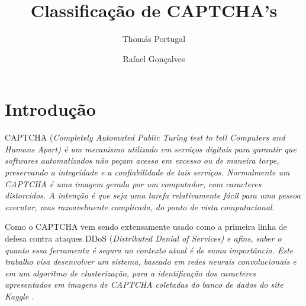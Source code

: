 \documentclass[11pt]{article}
\title{Classificação de CAPTCHA's}
\author{Thomás Portugal \and Rafael Gonçalves}
\begin{document}

  \section{Introdu\c{c}\~{a}o}
  \label{sec:introducao}

CAPTCHA (\em Completely Automated Public Turing test to tell Computers and Humans Apart\em ) é um mecanismo utilizado em serviços digitais para garantir que softwares automatizados não peçam acesso em excesso ou de maneira torpe, preservando a integridade e a confiabilidade de tais serviços. Normalmente um CAPTCHA é uma imagem gerada por um computador, com caracteres distorcidos. A intenção é que seja uma tarefa relativamente fácil para uma pessoa executar, mas razoavelmente complicada, do ponto de vista computacional.

Como o CAPTCHA vem sendo extensamente usado como a primeira linha de defesa contra ataques DDoS (\em Distributed Denial of Services\em ) e afins, saber o quanto essa ferramenta é segura no contexto atual é de suma importância.
Este trabalho visa desenvolver um sistema, baseado em redes neurais convolucionais e em um algoritmo de clusterização, para a identificação dos caracteres apresentados em imagens de CAPTCHA coletadas do banco de dados do site Kaggle \cite{data}.
\end{document}
